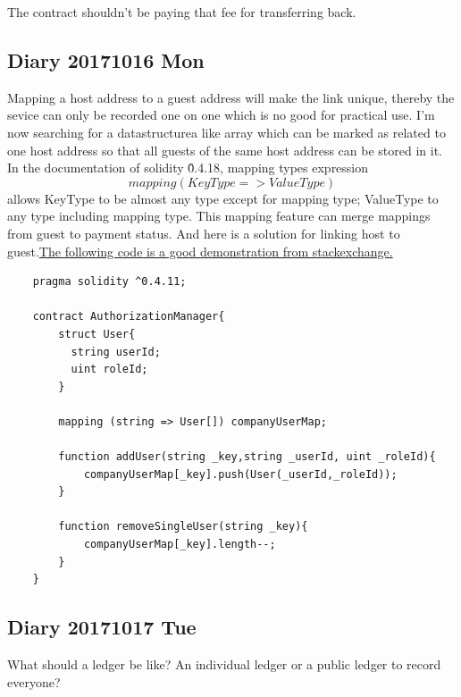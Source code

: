     
The contract shouldn't be paying that fee for transferring back. 



\subsection{Diary 20171016 Mon}
Mapping a host address to a guest address will make the link unique, thereby the sevice can only be recorded one on one which is no good for practical use.
I'm now searching for a datastructurea like array which can be marked as related to one host address so that all guests of the same host address can be stored in it.
In the documentation of solidity \^0.4.18, mapping types expression $$mapping(KeyType => ValueType)$$
allows KeyType to be almost any type except for mapping type; ValueType to any type including mapping type.
This mapping feature can merge mappings from guest to payment status.
And here is a solution for linking host to guest.\href{https://ethereum.stackexchange.com/questions/27053/how-to-create-a-mapping-of-string-and-struct-array-in-solidity}{The following code is a good demonstration from stackexchange.}
\begin{lstlisting}
    pragma solidity ^0.4.11;
    
    contract AuthorizationManager{
        struct User{
          string userId;
          uint roleId;
        }
    
        mapping (string => User[]) companyUserMap;
    
        function addUser(string _key,string _userId, uint _roleId){
            companyUserMap[_key].push(User(_userId,_roleId));
        }
    
        function removeSingleUser(string _key){
            companyUserMap[_key].length--;
        }
    }
\end{lstlisting}
\subsection{Diary 20171017 Tue}
What should a ledger be like?
An individual ledger or a public ledger to record everyone?
